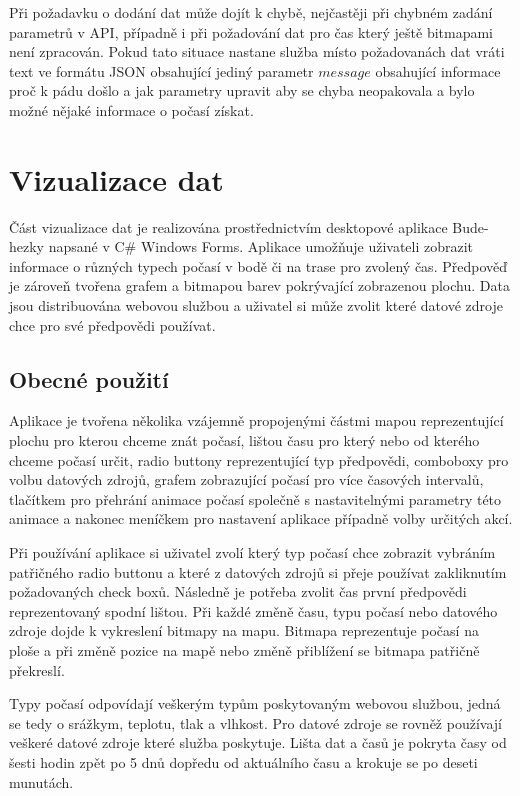 \documentclass[czech,bachelor,dept460,male,csharp,cpdeclaration]{diploma}
\begin{document}
	Při požadavku o dodání dat může dojít k chybě, nejčastěji při chybném zadání parametrů v API, případně i při požadování dat pro čas který ještě bitmapami není zpracován. Pokud tato situace nastane služba místo požadovanách dat vráti text ve formátu JSON obsahující jediný parametr $message$ obsahující informace proč k pádu došlo a jak parametry upravit aby se chyba neopakovala a bylo možné nějaké informace o počasí získat.
	
	\chapter{Vizualizace dat}
	
	Část vizualizace dat je realizována prostřednictvím desktopové aplikace Bude-hezky napsané v C\# Windows Forms. Aplikace umožňuje uživateli zobrazit informace o různých typech počasí v bodě či na trase pro zvolený čas. Předpověď je zároveň tvořena grafem a bitmapou barev pokrývající zobrazenou plochu. Data jsou distribuována webovou službou a uživatel si může zvolit které datové zdroje chce pro své předpovědi používat.
	
	\section{Obecné použití}
	
	Aplikace je tvořena několika vzájemně propojenými částmi mapou reprezentující plochu pro kterou chceme znát počasí, lištou času pro který nebo od kterého chceme počasí určit, radio buttony reprezentující typ předpovědi, comboboxy pro volbu datových zdrojů, grafem zobrazující počasí pro více časových intervalů, tlačítkem pro přehrání animace počasí společně s nastavitelnými parametry této animace a nakonec meníčkem pro nastavení aplikace případně volby určitých akcí.
	
	Při používání aplikace si uživatel zvolí který typ počasí chce zobrazit vybráním patřičného radio buttonu a které z datových zdrojů si přeje používat zakliknutím požadovaných check boxů. Následně je potřeba zvolit čas první předpovědi reprezentovaný spodní lištou. Při každé změně času, typu počasí nebo datového zdroje dojde k vykreslení bitmapy na mapu. Bitmapa reprezentuje počasí na ploše a při změně pozice na mapě nebo změně přiblížení se bitmapa patřičně překreslí.
	
	Typy počasí odpovídají veškerým typům poskytovaným webovou službou, jedná se tedy o srážkym, teplotu, tlak a vlhkost. Pro datové zdroje se rovněž používají veškeré datové zdroje které služba poskytuje. Lišta dat a časů 
	je pokryta časy od šesti hodin zpět po 5 dnů dopředu od aktuálního času a krokuje se po deseti munutách.
	
\end{document}
